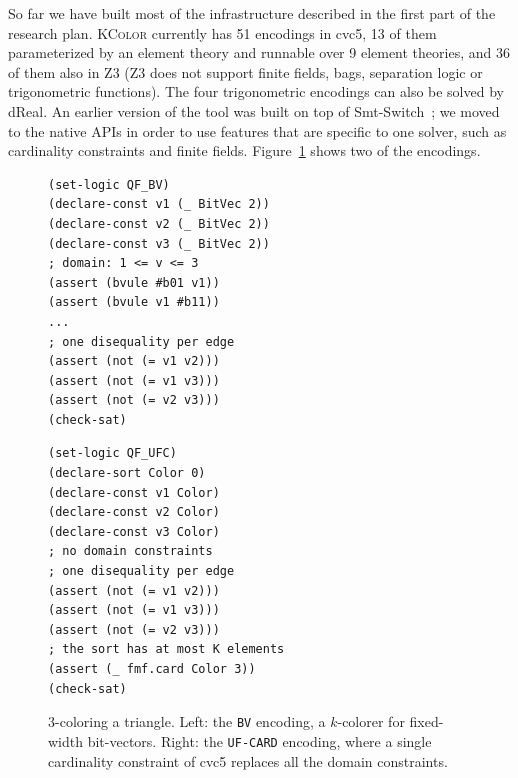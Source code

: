 \documentclass[12pt,a4paper]{article}
\newcommand{\tool}{\textsc{KColor}}
\newcommand{\enc}[1]{\texttt{#1}}
\theoremstyle{definition}
\begin{document}
So far we have built most of the infrastructure described in the first part of the
research plan. \tool{} currently has 51 encodings in cvc5, 13 of them
parameterized by an element theory and runnable over 9 element theories, and 36 of
them also in Z3 (Z3 does not support finite fields, bags, separation logic or
trigonometric functions). The four trigonometric encodings can also be solved by
dReal. An earlier version of the tool was built on top of
Smt-Switch~\cite{smtswitch}; we moved to the native APIs in order to use features
that are specific to one solver, such as cardinality constraints and finite fields.
Figure~\ref{fig:smtlib} shows two of the encodings.

\begin{figure}[t]
  \centering
  \begin{minipage}[t]{0.48\textwidth}
\begin{lstlisting}
(set-logic QF_BV)
(declare-const v1 (_ BitVec 2))
(declare-const v2 (_ BitVec 2))
(declare-const v3 (_ BitVec 2))
; domain: 1 <= v <= 3
(assert (bvule #b01 v1))
(assert (bvule v1 #b11))
...
; one disequality per edge
(assert (not (= v1 v2)))
(assert (not (= v1 v3)))
(assert (not (= v2 v3)))
(check-sat)
\end{lstlisting}
  \end{minipage}\hfill
  \begin{minipage}[t]{0.48\textwidth}
\begin{lstlisting}
(set-logic QF_UFC)
(declare-sort Color 0)
(declare-const v1 Color)
(declare-const v2 Color)
(declare-const v3 Color)
; no domain constraints
; one disequality per edge
(assert (not (= v1 v2)))
(assert (not (= v1 v3)))
(assert (not (= v2 v3)))
; the sort has at most K elements
(assert (_ fmf.card Color 3))
(check-sat)
\end{lstlisting}
  \end{minipage}
  \caption{3-coloring a triangle. Left: the \enc{BV} encoding, a $k$-colorer for
  fixed-width bit-vectors. Right: the \enc{UF-CARD} encoding, where a single
  cardinality constraint of cvc5 replaces all the domain constraints.}
  \label{fig:smtlib}
\end{figure}
\end{document}
